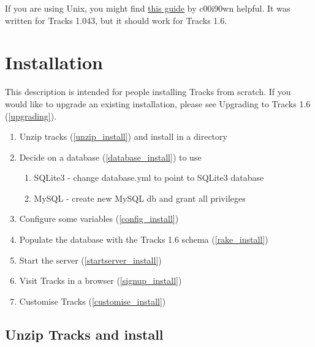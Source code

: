 \documentclass[10pt,twoside]{memoir}
\begin{document}
If you are using Unix, you might find \href{http://www.cooldown.com.ar/2006/12/16/install-tracks-on-ubuntu-or-debian/}{this guide} by c00i90wn helpful. It was written for Tracks 1.043, but it should work for Tracks 1.6.


\section{Installation}
\label{installation}

This description is intended for people installing Tracks from scratch. If you would like to upgrade an existing installation, please see Upgrading to Tracks 1.6 (\autoref{upgrading}).


\begin{enumerate}


\item Unzip tracks (\autoref{unzip_install}) and install in a directory

\item Decide on a database (\autoref{database_install}) to use
\begin{enumerate}


\item SQLite3 - change database.yml to point to SQLite3 database

\item MySQL - create new MySQL db and grant all privileges 
\end{enumerate}



\item Configure some variables (\autoref{config_install})

\item Populate the database with the Tracks 1.6 schema (\autoref{rake_install})

\item Start the server (\autoref{startserver_install})

\item Visit Tracks in a browser (\autoref{signup_install})

\item Customise Tracks (\autoref{customise_install})
\end{enumerate}

\subsection{Unzip Tracks and install}
\label{unzip_install}
\end{document}
